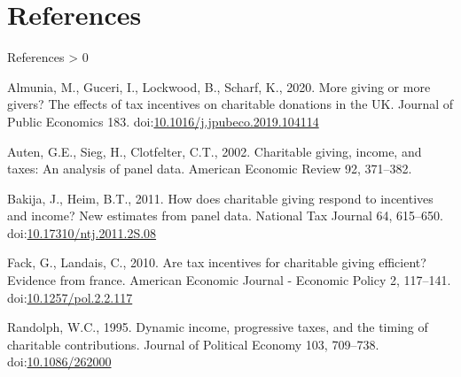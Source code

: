\documentclass[
  ignorenonframetext,
  aspectratio=169]{beamer}
\newlength{\cslhangindent}
\newenvironment{CSLReferences}[2] %
 {%
  \setlength{\parindent}{0pt}
  \ifodd #1 \everypar{\setlength{\hangindent}{\cslhangindent}}\ignorespaces\fi
  \ifnum #2 > 0
  \setlength{\parskip}{#2\baselineskip}
  \fi
 }%
 {}
\begin{document}
\hypertarget{references}{%
\section*{References}\label{references}}

\begin{frame}[allowframebreaks]{References}
\hypertarget{refs}{}
\begin{CSLReferences}{1}{0}
\leavevmode\hypertarget{ref-Almunia2020}{}%
Almunia, M., Guceri, I., Lockwood, B., Scharf, K., 2020. More giving or more givers? The effects of tax incentives on charitable donations in the UK. Journal of Public Economics 183. doi:\href{https://doi.org/10.1016/j.jpubeco.2019.104114}{10.1016/j.jpubeco.2019.104114}

\leavevmode\hypertarget{ref-Auten2002}{}%
Auten, G.E., Sieg, H., Clotfelter, C.T., 2002. Charitable giving, income, and taxes: An analysis of panel data. American Economic Review 92, 371--382.

\leavevmode\hypertarget{ref-Bakija2011}{}%
Bakija, J., Heim, B.T., 2011. How does charitable giving respond to incentives and income? New estimates from panel data. National Tax Journal 64, 615--650. doi:\href{https://doi.org/10.17310/ntj.2011.2S.08}{10.17310/ntj.2011.2S.08}

\leavevmode\hypertarget{ref-Fack2010}{}%
Fack, G., Landais, C., 2010. Are tax incentives for charitable giving efficient? Evidence from france. American Economic Journal - Economic Policy 2, 117--141. doi:\href{https://doi.org/10.1257/pol.2.2.117}{10.1257/pol.2.2.117}

\leavevmode\hypertarget{ref-Randolph1995}{}%
Randolph, W.C., 1995. Dynamic income, progressive taxes, and the timing of charitable contributions. Journal of Political Economy 103, 709--738. doi:\href{https://doi.org/10.1086/262000}{10.1086/262000}

\end{CSLReferences}
\end{frame}
\end{document}
